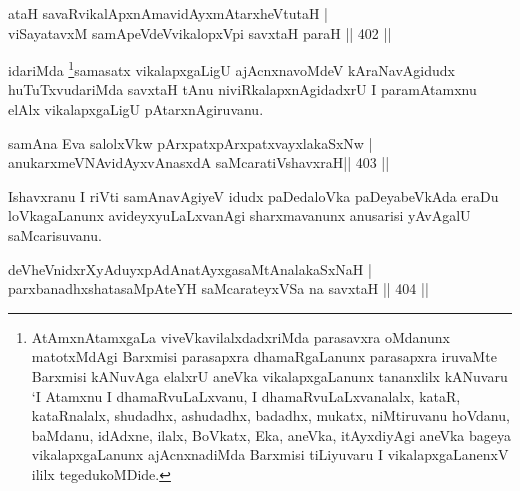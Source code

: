 
\begin{shl}
ataH savaRvikalApxnAmavidAyxmAtarxheVtutaH | \\
viSayatavxM samApeVdeV\s vikalopxV\s pi savxtaH paraH \hfill||  402 ||  
\end{shl}

\begin{artha}
idariMda \footnote[1]{AtAmxnAtamxgaLa viveVkavilalxdadxriMda parasavxra oMdanunx matotxMdAgi Barxmisi parasapxra dhamaRgaLanunx parasapxra iruvaMte Barxmisi kANuvAga elalxrU aneVka vikalapxgaLanunx tananxlilx kANuvaru `I Atamxnu I dhamaRvuLaLxvanu, I dhamaRvuLaLxvanalalx, kataR, kataRnalalx, shudadhx, ashudadhx, badadhx, mukatx, niMtiruvanu hoVdanu, baMdanu, idAdxne, ilalx, BoVkatx, Eka, aneVka, itAyxdiyAgi aneVka bageya vikalapxgaLanunx ajAcnxnadiMda Barxmisi tiLiyuvaru I vikalapxgaLanenxV ililx tegedukoMDide.}samasatx vikalapxgaLigU ajAcnxnavoMdeV kAraNavAgidudx huTuTxvudariMda savxtaH tAnu niviRkalapxnAgidadxrU I paramAtamxnu elAlx vikalapxgaLigU pAtarxnAgiruvanu.
\end{artha}


\begin{shl}
samAna Eva salolxVkw pArxpatxpArxpatxvayxlakaSxNw | \\
anukarxmeVNAvidAyxvAnasxdA saMcaratiVshavxraH\footnotemark[2] \hfill||  403 ||  
\end{shl}

\begin{artha}
Ishavxranu I riVti samAnavAgiyeV idudx paDedaloVka paDeyabeVkAda eraDu loVkagaLanunx avideyxyuLaLxvanAgi sharxmavanunx anusarisi yAvAgalU saMcarisuvanu.
\end{artha}


\begin{shl}
deVheVnidxrXyAduyxpAdAnatAyxgasaMtAnalakaSxNaH | \\
parxbanadhxshatasaMpAteYH saMcarateyxVSa na savxtaH \hfill||  404 ||  
\end{shl}	

